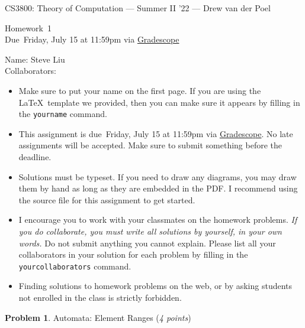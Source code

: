 \documentclass[11pt]{article}
\newcommand{\yourname}{}
\newcommand{\yourcollaborators}{}
\theoremstyle{definition}
\newcommand{\instructor}{Drew van der Poel}
\newcommand{\hwnum}{1}
\newcommand{\hwdue}{Friday, July 15 at 11:59pm via \href{https://www.gradescope.com/courses/406943}{Gradescope}}
\theoremstyle{theorem}
\newtheorem{prob}{Problem}
\begin{document}
{\Large 
\begin{center}{CS3800: Theory of Computation} --- Summer II '22 --- \instructor \end{center}}
{\large
\vspace{10pt}
\noindent Homework~\hwnum \vspace{2pt}\\
Due~\hwdue}

\bigskip
{\large
\noindent Name: Steve Liu\yourname \vspace{2pt}\\ Collaborators: \yourcollaborators}

\vspace{15pt}
\begin{itemize}

\item Make sure to put your name on the first page.  If you are using the \LaTeX~template we provided, then you can make sure it appears by filling in the \texttt{yourname} command.

\item This assignment is due~\hwdue.  No late assignments will be accepted.  Make sure to submit something before the deadline.

\item Solutions must be typeset.  If you need to draw any diagrams, you may draw them by hand as long as they are embedded in the PDF.  I recommend using the source file for this assignment to get started.

\item I encourage you to work with your classmates on the homework problems. \emph{If you do collaborate, you must write all solutions by yourself, in your own words.}  Do not submit anything you cannot explain.  Please list all your collaborators in your solution for each problem by filling in the \texttt{yourcollaborators} command.

\item Finding solutions to homework problems on the web, or by asking students not enrolled in the class is strictly forbidden.

\end{itemize}



\newpage

\begin{prob} Automata: Element Ranges (\emph{4 points})\end{prob}
\end{document}
